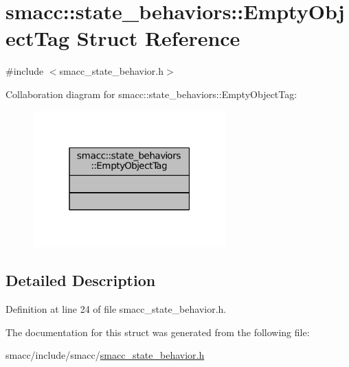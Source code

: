 \hypertarget{structsmacc_1_1state__behaviors_1_1EmptyObjectTag}{}\section{smacc\+:\+:state\+\_\+behaviors\+:\+:Empty\+Object\+Tag Struct Reference}
\label{structsmacc_1_1state__behaviors_1_1EmptyObjectTag}


{\ttfamily \#include $<$smacc\+\_\+state\+\_\+behavior.\+h$>$}



Collaboration diagram for smacc\+:\+:state\+\_\+behaviors\+:\+:Empty\+Object\+Tag\+:
\nopagebreak
\begin{figure}[H]
\begin{center}
\leavevmode
\includegraphics[width=211pt]{structsmacc_1_1state__behaviors_1_1EmptyObjectTag__coll__graph}
\end{center}
\end{figure}


\subsection{Detailed Description}


Definition at line 24 of file smacc\+\_\+state\+\_\+behavior.\+h.



The documentation for this struct was generated from the following file\+:\begin{DoxyCompactItemize}
\item 
smacc/include/smacc/\hyperlink{smacc__state__behavior_8h}{smacc\+\_\+state\+\_\+behavior.\+h}\end{DoxyCompactItemize}
